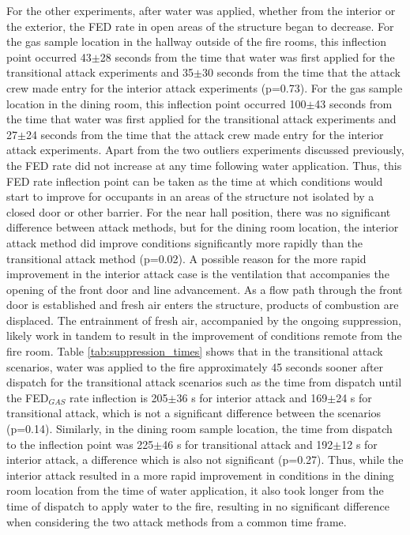 \documentclass[12pt,oneside]{article}
\begin{document}
For the other experiments, after water was applied, whether from the interior or the exterior, the FED rate in open areas of the structure began to decrease. For the gas sample location in the hallway outside of the fire rooms, this inflection point occurred 43$\pm$28 seconds from the time that water was first applied for the transitional attack experiments and 35$\pm$30 seconds from the time that the attack crew made entry for the interior attack experiments (p=0.73). For the gas sample location in the dining room, this inflection point occurred 100$\pm$43 seconds from the time that water was first applied for the transitional attack experiments and 27$\pm$24 seconds from the time that the attack crew made entry for the interior attack experiments. Apart from the two outliers experiments discussed previously, the FED rate did not increase at any time following water application. Thus, this FED rate inflection point can be taken as the time at which conditions would start to improve for occupants in an areas of the structure not isolated by a closed door or other barrier. For the near hall position, there was no significant difference between attack methods, but for the dining room location, the interior attack method did improve conditions significantly more rapidly than the transitional attack method (p=0.02). A possible reason for the more rapid improvement in the interior attack case is the ventilation that accompanies the opening of the front door and line advancement. As a flow path through the front door is established and fresh air enters the structure, products of combustion are displaced. The entrainment of fresh air, accompanied by the ongoing suppression, likely work in tandem to result in the improvement of conditions remote from the fire room. Table \ref{tab:suppression_times} shows that in the transitional attack scenarios, water was applied to the fire approximately 45 seconds sooner after dispatch for the transitional attack scenarios such as the time from dispatch until the FED$_{GAS}$ rate inflection is 205$\pm$36 s for interior attack and 169$\pm$24 s for transitional attack, which is not a significant difference between the scenarios (p=0.14). Similarly, in the dining room sample location, the time from dispatch to the inflection point was 225$\pm$46 s for transitional attack and 192$\pm$12 s for interior attack, a difference which is also not significant (p=0.27). Thus, while the interior attack resulted in a more rapid improvement in conditions in the dining room location from the time of water application, it also took longer from the time of dispatch to apply water to the fire, resulting in no significant difference when considering the two attack methods from a common time frame. 
\end{document}

